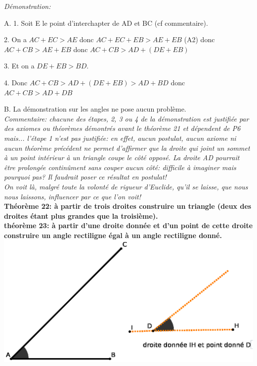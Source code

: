 \documentclass[a4paper, 12pt, twoside]{book}
\begin{document}
  
 \textit{Démonstration:}\ 
  
 A. 1. Soit E le point d'interchapter de AD et BC (cf commentaire).\medskip 
  
  2. On a $AC+EC>AE $ donc $AC+EC+EB>AE+EB $ (A2) donc $AC+CB>AE+EB$ donc $AC+CB>AD+(DE+EB)$ \medskip 
  
   
  3. Et on a  $DE+EB>BD$.\medskip 
    
  4. Donc  $AC+CB>AD+(DE+EB)>AD+BD $ donc $AC+CB>AD+DB$ \medskip 
  
  B. La démonstration sur les angles ne pose aucun problème.\\
  
  
  
 
     
\textit{Commentaire: chacune des étapes, 2, 3 ou 4 de la démonstration est justifiée par des axiomes ou théorèmes démontrés avant le théorème 21 et dépendent de P6 mais... l'étape 1 n'est pas justifiée: en effet, aucun postulat, aucun axiome ni aucun théorème précédent ne permet d'affirmer que la droite qui joint un sommet à un point intérieur à un triangle coupe le côté opposé. La droite AD pourrait être prolongée continûment sans couper aucun côté: difficile à imaginer mais pourquoi pas? Il faudrait poser ce résultat   en postulat! \\
On voit là, malgré toute la volonté de rigueur d'Euclide, qu'il se laisse, que nous nous laissons, influencer par ce que l'on voit!}\\

 \textbf{Théorème 22: à partir de trois droites construire un triangle (deux des droites étant plus grandes que la troisième).}\\
 
  
  \newpage \textbf{théorème 23: à partir d'une droite donnée et d'un point de cette droite construire un angle rectiligne égal à un angle rectiligne donné.} \\
  
 
 \includegraphics[scale=0.7]{figures/LIVRE1&23.eps} \\
 
\end{document}
